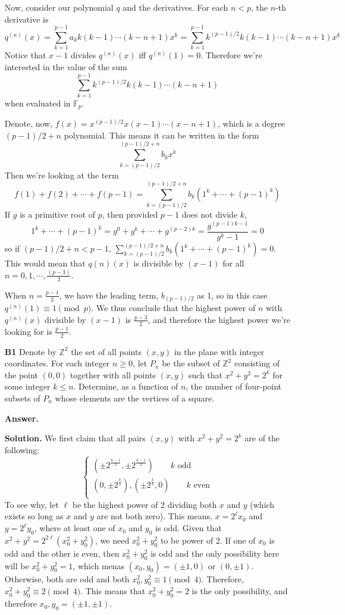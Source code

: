 \documentclass[11pt,a4paper]{article}
\newcommand{\bbF}{\mathbb F}
\newcommand{\<}{\langle}
\renewcommand{\>}{\rangle}
\newcommand{\dsum}{\displaystyle\sum}
\begin{document}
\begin{enumerate}
	Now, consider our polynomial $q$ and the derivatives. For each $n<p$, the $n$-th derivative is 
	\[
	q^{(n)}(x)=\dsum_{k=1}^{p-1}a_kk(k-1)\cdots(k-n+1)x^k
	=\dsum_{k=1}^{p-1}k^{(p-1)/2}k(k-1)\cdots(k-n+1)x^k
	\]
	Notice that $x-1$ divides $q^{(n)}(x)$ iff $q^{(n)}(1)=0$. Therefore we're interested in the value of the sum 
	\[
	\dsum_{k=1}^{p-1}k^{(p-1)/2}k(k-1)\cdots(k-n+1)
	\]
	when evaluated in $\bbF_p$. 
	
	Denote, now, $f(x)=x^{(p-1)/2}x(x-1)\cdots(x-n+1)$, which is a degree $(p-1)/2+n$ polynomial. This means it can be written in the form 
	\[
	\dsum_{k=(p-1)/2}^{(p-1)/2+n} b_kx^k
	\]
	Then we're looking at the term 
	\[
	f(1)+f(2)+\cdots + f(p-1)= \dsum_{k=(p-1)/2}^{(p-1)/2+n} b_k(1^k+\cdots + (p-1)^k)
	\]
	If $g$ is a primitive root of $p$, then provided $p-1$ does not divide $k$, 
	\[
	1^k+\cdots + (p-1)^k
	=g^0+g^k+\cdots + g^{(p-2)k}
	=\frac{g^{(p-1)k-1}}{g^k-1}
	=0
	\]
	so if $(p-1)/2+n<p-1$, $\dsum_{k=(p-1)/2}^{(p-1)/2+n} b_k(1^k+\cdots + (p-1)^k)=0$. 
	This would mean that $q{(n)}(x)$ is divisible by $(x-1)$ for all $n=0, 1, \cdots, \frac{(p-3)}{2}$. 
	
	When $n=\frac{p-1}{2}$, we have the leading term, $b_{(p-1)/2}$ as 1, so in this case $q^{(n)}(1)\equiv 1\pmod{p}$. We thus conclude that the highest power of $n$ with $q^{(n)}(x)$ divisible by $(x-1)$ is $\frac{p-3}{2}$, and therefore the highest power we're looking for is $\frac{p-1}{2}$. 
	
	\item [\textbf{B1}] Denote by $\mathbb Z^2$ the set of all points $(x,y)$ in the plane with integer coordinates.  For each integer $n\geq 0$, let $P_n$ be the subset of $\mathbb Z^2$ consisting of the point $(0,0)$ together with all points $(x,y)$ such that $x^2+y^2=2^k$ for some integer $k\leq n$.  Determine, as a function of $n$, the number of four-point subsets of $P_n$ whose elements are the vertices of a square.
	
	\textbf{Answer.} 
	
	\textbf{Solution.} We first claim that all pairs $(x, y)$ with $x^2+y^2=2^k$ are of the following: 
	\[
	\begin{cases}
	(\pm 2^{\frac{k-1}{2}}, \pm 2^{\frac{k-1}{2}})\qquad k\text{ odd}\\
	(0, \pm 2^{\frac k2}), (\pm 2^{\frac k2}, 0)\qquad k\text{ even}\\
	\end{cases}
	\]
	To see why, let $\ell$ be the highest power of 2 dividing both $x$ and $y$ (which exists so long as $x$ and $y$ are not both zero). 
	This means, $x=2^{\ell}x_0$ and $y=2^{\ell}y_0$, where at least one of $x_0$ and $y_0$ is odd. 
	Given that $x^2+y^2=2^{2\ell}(x_0^2+y_0^2)$, we need $x_0^2+y_0^2$ to be power of 2. 
	If one of $x_0$ is odd and the other is even, then $x_0^2+y_0^2$ is odd and the only possibility here will be $x_0^2+y_0^2=1$, which menas $(x_0, y_0)=(\pm 1, 0)$ or $(0, \pm 1)$. 
	Otherwise, both are odd and both $x_0^2, y_0^2\equiv 1\pmod{4}$. 
	Therefore, $x_0^2+y_0^2\equiv 2\pmod{4}$. This means that $x_0^2+y_0^2=2$ is the only possibility, and therefore $x_0, y_0=(\pm 1, \pm 1)$. 
	

\end{enumerate}
\end{document}
